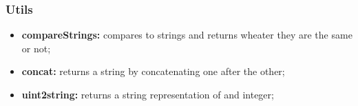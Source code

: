 \subsubsection{Utils}
\begin{itemize}
	\item \textbf{compareStrings:} compares to strings and returns wheater they are the same or not;
	\item \textbf{concat:} returns a string by concatenating one after the other;
	\item \textbf{uint2string:} returns a string representation of and integer;
\end{itemize}